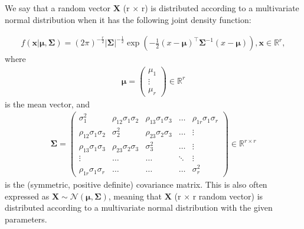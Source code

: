 We say that a random vector $\bm{X}$ (r $\times$ r)
is distributed according to a multivariate normal distribution
when it has the following joint density function\autocite[p. 59]{izenman_modern_2008}:
\begin{definition}
    \begin{align}
        f(\bm{x}| \bm{\mu}, \bm{\Sigma})
        = (2\pi)^{-\frac{r}{2}}
        \left|\bm{\Sigma}\right|^{-\frac{1}{2}}
        \exp\left(-\frac{1}{2}(x-\bm{\mu})^\top \bm{\Sigma}^{-1} (x-\bm{\mu})\right),
        \bm{x} \in \mathbb{R}^r,
    \end{align}
    where
    \begin{align}
        \bm{\mu} =
        \begin{pmatrix}
            \mu_1  \\
            \vdots \\
            \mu_r
        \end{pmatrix}
        \in \mathbb{R}^r
    \end{align}
    is the mean vector, and
    \begin{align}
        \bm{\Sigma} =
        \begin{pmatrix}
            \sigma_1^2                & \rho_{12}\sigma_1\sigma_2 & \rho_{13}\sigma_1\sigma_3 & \ldots & \rho_{1r}\sigma_1\sigma_r \\
            \rho_{12}\sigma_1\sigma_2 & \sigma_2^2                & \rho_{23}\sigma_2\sigma_3 & \ldots & \vdots                    \\
            \rho_{13}\sigma_1\sigma_3 & \rho_{23}\sigma_2\sigma_3 & \sigma_3^2                & \ldots & \vdots                    \\
            \vdots                    & \ldots                    & \ldots                    & \ddots & \vdots                    \\
            \rho_{1r}\sigma_1\sigma_r & \ldots                    & \ldots                    & \ldots & \sigma_r^2
        \end{pmatrix}
        \in \mathbb{R}^{r\times r}
    \end{align}
    is the (symmetric, positive definite) covariance matrix.
    This is also often expressed as $\bm{X} \sim \mathcal{N}(\bm{\mu}, \bm{\Sigma})$,
    meaning that $\bm{X}$ (r $\times$ r random vector) is distributed
    according to a multivariate normal distribution with the given parameters.
\end{definition}

